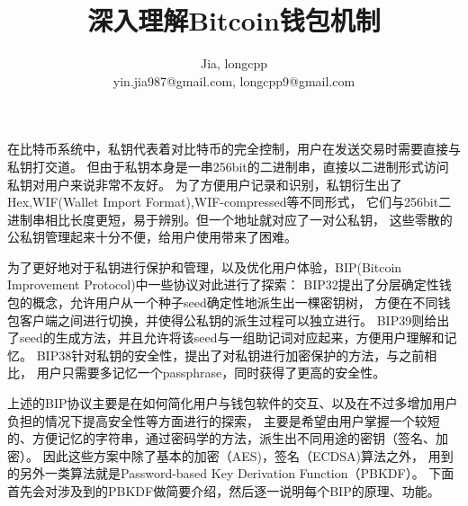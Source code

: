 \documentclass{article}
\begin{document}
\title{深入理解Bitcoin钱包机制}
\author{Jia, longcpp \\ \small{yin.jia987@gmail.com, longcpp9@gmail.com}}

\maketitle


在比特币系统中，私钥代表着对比特币的完全控制，用户在发送交易时需要直接与私钥打交道。
但由于私钥本身是一串256bit的二进制串，直接以二进制形式访问私钥对用户来说非常不友好。
为了方便用户记录和识别，私钥衍生出了Hex,WIF(Wallet Import Format),WIF-compressed等不同形式，
它们与256bit二进制串相比长度更短，易于辨别。但一个地址就对应了一对公私钥，
这些零散的公私钥管理起来十分不便，给用户使用带来了困难。

为了更好地对于私钥进行保护和管理，以及优化用户体验，BIP(Bitcoin Improvement Protocol)中一些协议对此进行了探索：
BIP32提出了分层确定性钱包的概念，允许用户从一个种子seed确定性地派生出一棵密钥树，
方便在不同钱包客户端之间进行切换，并使得公私钥的派生过程可以独立进行。
BIP39则给出了seed的生成方法，并且允许将该seed与一组助记词对应起来，方便用户理解和记忆。
BIP38针对私钥的安全性，提出了对私钥进行加密保护的方法，与之前相比，
用户只需要多记忆一个passphrase，同时获得了更高的安全性。

上述的BIP协议主要是在如何简化用户与钱包软件的交互、以及在不过多增加用户负担的情况下提高安全性等方面进行的探索，
主要是希望由用户掌握一个较短的、方便记忆的字符串，通过密码学的方法，派生出不同用途的密钥（签名、加密）。
因此这些方案中除了基本的加密（AES)，签名（ECDSA)算法之外，
用到的另外一类算法就是Password-based Key Derivation Function（PBKDF）。
下面首先会对涉及到的PBKDF做简要介绍，然后逐一说明每个BIP的原理、功能。








\end{document}

